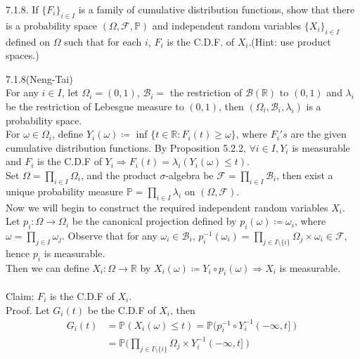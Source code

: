 \begin{exercise}
    7.1.8. If $\{ F_i\}_{i \in I}$ is a family of cumulative distribution functions, show that there is a probability space $(\Omega ,\mathcal{F}, \mathbb{P} )$ and independent random variables $\{ X_i\}_{i \in I}$ defined on $\Omega$ such that for each $i$, $F_i$ is the C.D.F. of $X_i$.(Hint: use product spaces.)
\end{exercise}
\begin{answer}
    7.1.8(Neng-Tai)
    \\For any $i \in I$, let $\Omega_{i} = (0,1)$, $\mathcal{B}_i = $ the restriction of $\mathcal{B}(\mathbb{R})$ to $(0,1)$ and $\lambda_{i}$ be the restriction of Lebesgue measure to $(0,1)$, then $(\Omega_i, \mathcal{B}_i, \lambda_i)$ is a probability space.
    \\For $\omega \in \Omega_i$, define $Y_{i}(\omega) \coloneqq$ inf $\{ t \in \mathbb{R} : F_{i}(t)\geq \omega\}$, where $F_{i} { } 's$ are the given cumulative distribution functions. By Proposition 5.2.2, $\forall i \in I, Y_i$ is measurable and $F_i$ is the C.D.F of $Y_i \Longrightarrow F_{i}(t) = \lambda_{i}(Y_{i}(\omega) \leq t)$.
    \\Set $\Omega = \prod_{i \in I}\Omega_i$, and the product $\sigma $-algebra be $\mathcal{F} = \prod_{i \in I} \mathcal{B}_i$, then exist a unique probability measure $\mathbb{P} = \prod_{i \in I} \lambda_i$ on $(\Omega, \mathcal{F})$.
    \\Now we will begin to construct the required independent random variables $X_i$. Let $p_i: \Omega \rightarrow \Omega_i$ be the canonical projection defined by $p_i(\omega) \coloneqq \omega_i$, where $\omega = \prod_{j \in I}\omega_j$. Observe that for any $\omega_i \in \mathcal{B}_i$, $p_{i}^{-1}(\omega_i) = \prod_{j \in I \setminus \{ i\}} \Omega_j \times \omega_i \in \mathcal{F}$, hence $p_i$ is measurable.
    \\Then we can define $X_i: \Omega \rightarrow \mathbb{R}$ by $X_i(\omega) \coloneqq Y_{i} \circ p_{i}(\omega) \Longrightarrow X_i$ is measurable.
    \\
    \\Claim: $F_i$ is the C.D.F of $X_i$.
    \\Proof. Let $G_i(t)$ be the C.D.F of $X_i$, then
    \begin{equation*}
        \begin{aligned}
            G_i(t) &= \mathbb{P}(X_i(\omega) \leq t)
            =\mathbb{P}(p_{i}^{-1} \circ Y_{i}^{-1} ( -\infty, t ]) 
            \\&= \mathbb{P}(\prod_{j \in I \setminus \{ i\}} \Omega_j \times Y_{i}^{-1} ( -\infty, t ])

\end{aligned}
\end{equation*}
\end{answer}
